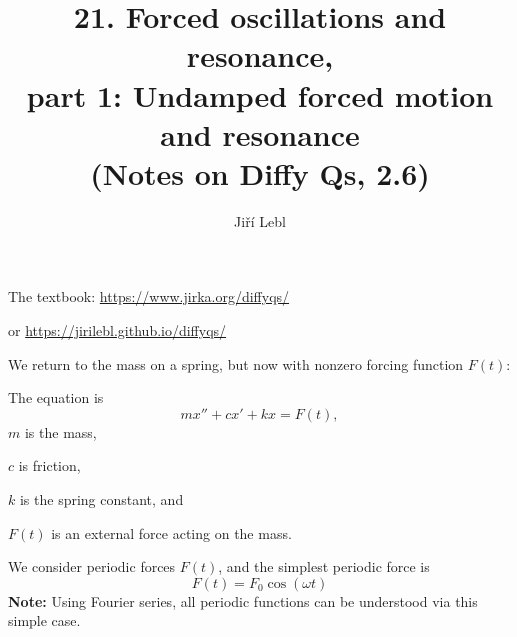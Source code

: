 \documentclass[10pt,aspectratio=169]{beamer}
\author{Ji\v{r}\'i Lebl}
\institute[OSU]{%
Oklahoma State University%
}
\title{21. Forced oscillations and resonance, \\part 1: Undamped forced motion and resonance\\(Notes on Diffy Qs, 2.6)}
\date{}
\begin{document}
\begin{frame}
\titlepage


\begin{center}
The textbook: \url{https://www.jirka.org/diffyqs/}

or \url{https://jirilebl.github.io/diffyqs/}
\end{center}
\end{frame}

\begin{frame}
We return to the mass on a spring, but now with nonzero forcing function $F(t)$:

\medskip

\hfill{}\hspace*{\fill}

\medskip
\pause

The equation is
\[
mx'' + cx' + kx = F(t) ,
\]
$m$ is the mass,

$c$ is friction,

$k$ is the spring constant, and

$F(t)$ is an external force acting on the mass.

\medskip
\pause

We consider periodic forces $F(t)$, and the simplest periodic
force is
\[
F(t) = F_0 \cos (\omega t)
\]
\pause
\textbf{Note:} Using Fourier series, all periodic functions can be understood
via this simple case.
\end{frame}
\end{document}
